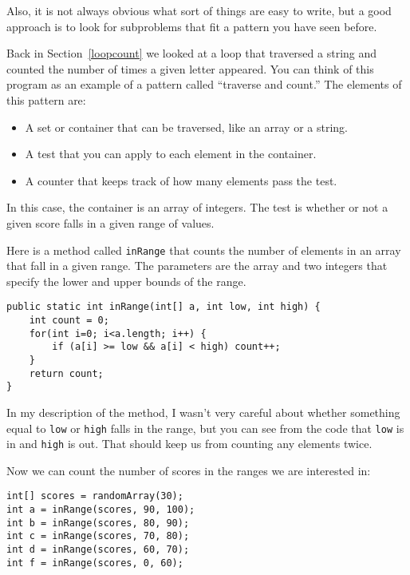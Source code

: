 \documentclass{book}
\begin{document}
Also, it is not always obvious what sort of things are easy to write,
but a good approach is to look for subproblems that fit a pattern you
have seen before.

Back in Section~\ref{loopcount} we looked at a loop that traversed a
string and counted the number of times a given letter appeared.  You
can think of this program as an example of a pattern called ``traverse
and count.''  The elements of this pattern are:

\begin{itemize}

\item A set or container that can be traversed, like an array
or a string.

\item A test that you can apply to each element in the container.

\item A counter that keeps track of how many elements pass
the test.

\end{itemize}

In this case, the container is an array of integers.  The
test is whether or not a given score falls in a given range of
values.

Here is a method called {\tt inRange}
that counts the number of elements in an array that fall
in a given range.  The parameters are the array and two
integers that specify the lower and upper bounds of
the range.

\begin{verbatim}
public static int inRange(int[] a, int low, int high) {
    int count = 0;
    for(int i=0; i<a.length; i++) {
        if (a[i] >= low && a[i] < high) count++;
    }
    return count;
}
\end{verbatim}
%
In my description of the method,
I wasn't very careful about whether something equal
to {\tt low} or {\tt high} falls in the range, but you can
see from the code that {\tt low} is in and {\tt high} is out.
That should keep us from counting any elements twice.

Now we can count the number of scores in the ranges we are
interested in:

\begin{verbatim}
int[] scores = randomArray(30);
int a = inRange(scores, 90, 100);
int b = inRange(scores, 80, 90);
int c = inRange(scores, 70, 80);
int d = inRange(scores, 60, 70);
int f = inRange(scores, 0, 60);
\end{verbatim}
\end{document}
